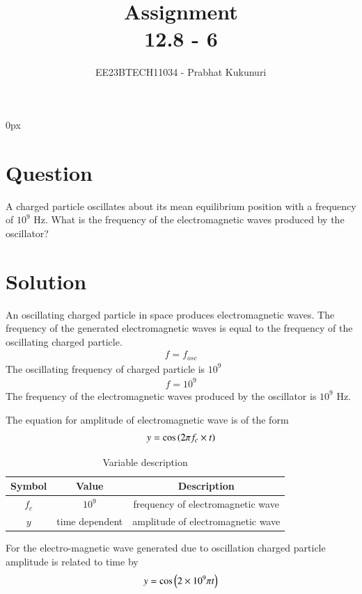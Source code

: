 \documentclass[journal,12pt,twocolumn]{IEEEtran}
\theoremstyle{remark}
\begin{document}
\parindent 0px


\title{Assignment\\[1ex]12.8 - 6}
\author{EE23BTECH11034 - Prabhat Kukunuri$^{}$%
}
\maketitle
\newpage
\bigskip

\renewcommand{\thefigure}{\theenumi}
\renewcommand{\thetable}{\theenumi}
\section*{Question}
A charged particle oscillates about its mean equilibrium position with a frequency of $10^9$ Hz. What is the frequency of the electromagnetic waves produced by the oscillator?

\section*{Solution}
An oscillating charged particle in space produces electromagnetic waves. The frequency of the generated electromagnetic waves is equal to the frequency of the oscillating charged particle.
\begin{align}
    f = f_{osc}
\end{align}
The oscillating frequency of charged particle is $10^9$
\begin{align}
    f = 10^9
\end{align}
The frequency of the electromagnetic waves produced by the oscillator is $10^9$ Hz.

The equation for amplitude of electromagnetic wave is of the form 
\begin{align}
    y = \cos\left(2{\pi}f_c\times t\right)
\end{align}
\begin{table}[h]
    \centering
    \begin{tabular}{|c|c|c|}
    \hline
   Symbol&Value&Description\\ \hline
   $f_c$&$10^9$&frequency of electromagnetic wave\\ \hline
   $y$&time dependent&amplitude of electromagnetic wave\\ \hline
    \end{tabular}
    \caption{Variable description}
    \label{tab:12.8.6.1}
\end{table}

For the electro-magnetic wave generated due to oscillation charged particle amplitude is related to time by
\begin{align}
    y = \cos\left(2\times10^9{\pi}t\right)
\end{align}
\end{document}
